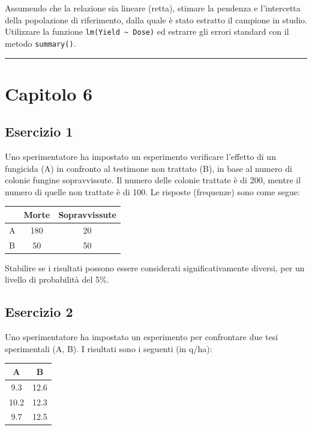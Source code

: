 \documentclass[a4paper,12pt,oneside]{book}
\begin{document}
Assumendo che la relazione sia lineare (retta), stimare la pendenza e l'intercetta della popolazione di riferimento, dalla quale è stato estratto il campione in studio. Utilizzare la funzione \texttt{lm(Yield\ \textasciitilde{}\ Dose)} ed estrarre gli errori standard con il metodo \texttt{summary()}.

\begin{center}\rule{0.5\linewidth}{0.5pt}\end{center}

\hypertarget{capitolo-6}{%
\section{Capitolo 6}\label{capitolo-6}}

\hypertarget{esercizio-1-4}{%
\subsection{Esercizio 1}\label{esercizio-1-4}}

Uno sperimentatore ha impostato un esperimento verificare l'effetto di un fungicida (A) in confronto al testimone non trattato (B), in base al numero di colonie fungine sopravvissute. Il numero delle colonie trattate è di 200, mentre il numero di quelle non trattate è di 100. Le risposte (frequenze) sono come segue:

\begin{longtable}[]{@{}lcc@{}}
\toprule
& Morte & Sopravvissute \\
\midrule
\endhead
A & 180 & 20 \\
B & 50 & 50 \\
\bottomrule
\end{longtable}

Stabilire se i risultati possono essere considerati significativamente diversi, per un livello di probabilità del 5\%.

\hypertarget{esercizio-2-3}{%
\subsection{Esercizio 2}\label{esercizio-2-3}}

Uno sperimentatore ha impostato un esperimento per confrontare due tesi sperimentali (A, B). I risultati sono i seguenti (in q/ha):

\begin{longtable}[]{@{}cc@{}}
\toprule
A & B \\
\midrule
\endhead
9.3 & 12.6 \\
10.2 & 12.3 \\
9.7 & 12.5 \\
\bottomrule
\end{longtable}
\end{document}
